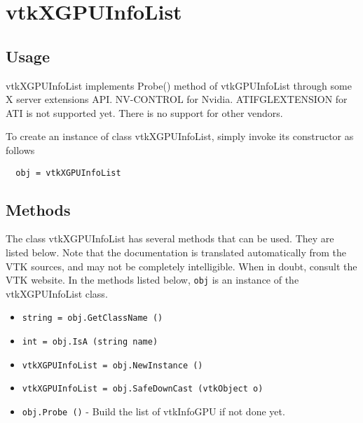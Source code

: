 \section{vtkXGPUInfoList}

\subsection{Usage}

 vtkXGPUInfoList implements Probe() method of vtkGPUInfoList
 through some X server extensions API. NV-CONTROL for Nvidia.
 ATIFGLEXTENSION for ATI is not supported yet.
 There is no support for other vendors.

To create an instance of class vtkXGPUInfoList, simply
invoke its constructor as follows
\begin{verbatim}
  obj = vtkXGPUInfoList
\end{verbatim}
\subsection{Methods}

The class vtkXGPUInfoList has several methods that can be used.
  They are listed below.
Note that the documentation is translated automatically from the VTK sources,
and may not be completely intelligible.  When in doubt, consult the VTK website.
In the methods listed below, \verb|obj| is an instance of the vtkXGPUInfoList class.
\begin{itemize}
\item  \verb|string = obj.GetClassName ()|

\item  \verb|int = obj.IsA (string name)|

\item  \verb|vtkXGPUInfoList = obj.NewInstance ()|

\item  \verb|vtkXGPUInfoList = obj.SafeDownCast (vtkObject o)|

\item  \verb|obj.Probe ()| -  Build the list of vtkInfoGPU if not done yet.
 

\end{itemize}
